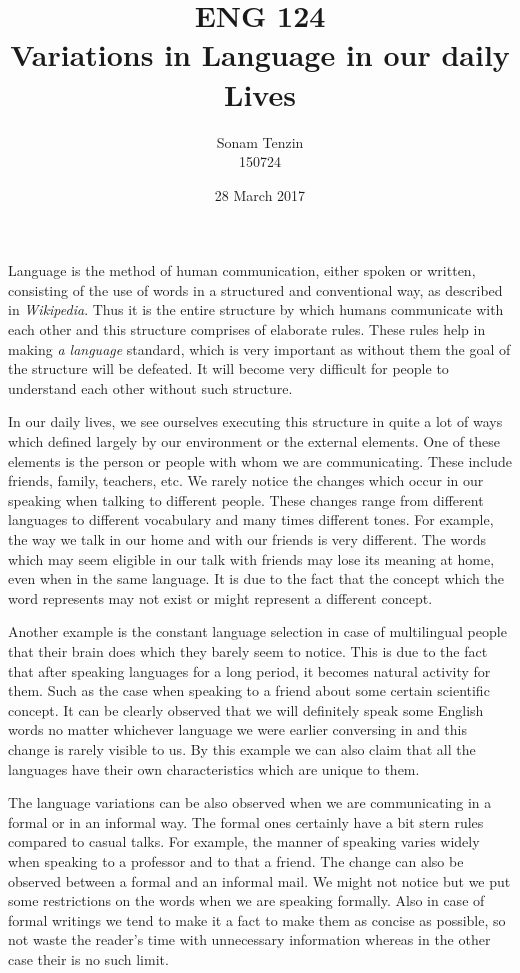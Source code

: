 \documentclass[12pt, a4paper]{article}
\title{ENG 124 \\
Variations in Language in our daily Lives}
\author{Sonam Tenzin \\
150724}
\date{28 March 2017}
\begin{document}
\maketitle
\newpage
Language is the method of human communication, either spoken or written, consisting of the use of words in a structured and conventional way, as described in \textit{Wikipedia}. Thus it is the entire structure by which humans communicate with each other and this structure comprises of elaborate rules. These rules help in making \textit{a language} standard, which is very important as without them the goal of the structure will be defeated. It will become very difficult for people to understand each other without such structure.\\ \par 

 In our daily lives, we see ourselves executing this structure in quite a lot of ways which defined largely by our environment or the external elements. One of these elements is the person or people with whom we are communicating. These include friends, family, teachers, etc. We rarely notice the changes which occur in our speaking when talking to different people. These changes range from different languages to different vocabulary and many times different tones. For example, the way we talk in our home and with our friends is very different. The words which may seem eligible in our talk with friends may lose its meaning at home, even when in the same language. It is due to the fact that the concept which the word represents may not exist or might represent a different concept.  \\ \par 
 
 Another example is the constant language selection in case of multilingual people that their brain does which they barely seem to notice. This is due to the fact that after speaking languages for a long period, it becomes natural activity for them. Such as the case when speaking to a friend about some certain scientific concept. It can be clearly observed that we will definitely speak some English words no matter whichever language we were earlier conversing in and this change is rarely visible to us. By this example we can also claim that all the languages have their own characteristics which are unique to them.\\ \par
 
 The language variations can be also observed when we are communicating in a formal or in an informal way. The formal ones certainly have a bit stern rules compared to casual talks. For example, the manner of speaking varies widely when speaking to a professor and to that a friend. The change can also be observed between a formal and an informal mail. We might not notice but we put some restrictions on the words when we are speaking formally. Also in case of formal writings we tend to make it a fact to make them as concise as possible, so not waste the reader's time with unnecessary information whereas in the other case their is no such limit. \\ \par
 
\end{document}
